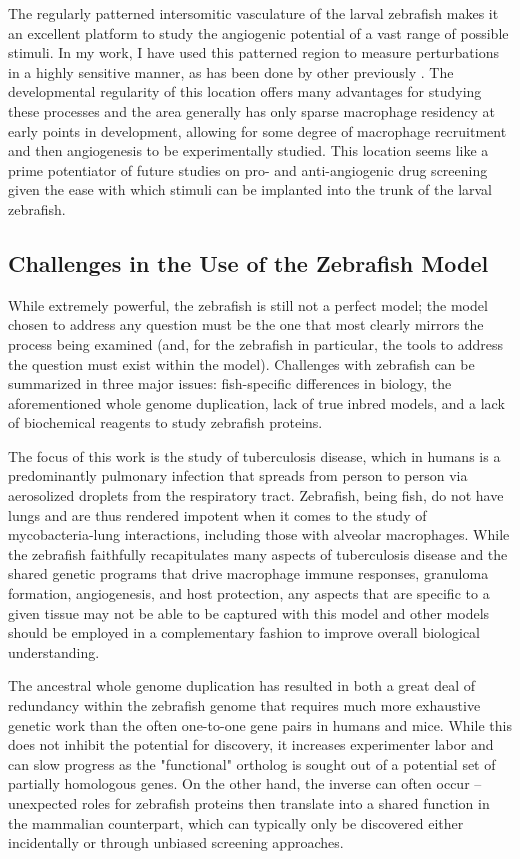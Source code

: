 The regularly patterned intersomitic vasculature of the larval zebrafish makes it an excellent platform to study the angiogenic potential of a vast range of possible stimuli. In my work, I have used this patterned region to measure perturbations in a highly sensitive manner, as has been done by other previously \citep{Oehlers2015, Walton2018}. The developmental regularity of this location offers many advantages for studying these processes and the area generally has only sparse macrophage residency at early points in development, allowing for some degree of macrophage recruitment and then angiogenesis to be experimentally studied. This location seems like a prime potentiator of future studies on pro- and anti-angiogenic drug screening given the ease with which stimuli can be implanted into the trunk of the larval zebrafish.

\subsection{Challenges in the Use of the Zebrafish Model}\label{zfchal}

While extremely powerful, the zebrafish is still not a perfect model; the model chosen to address any question must be the one that most clearly mirrors the process being examined (and, for the zebrafish in particular, the tools to address the question must exist within the model). Challenges with zebrafish can be summarized in three major issues: fish-specific differences in biology, the aforementioned whole genome duplication, lack of true inbred models, and a lack of biochemical reagents to study zebrafish proteins.

The focus of this work is the study of tuberculosis disease, which in humans is a predominantly pulmonary infection that spreads from person to person via aerosolized droplets from the respiratory tract. Zebrafish, being fish, do not have lungs and are thus rendered impotent when it comes to the study of mycobacteria-lung interactions, including those with alveolar macrophages. While the zebrafish faithfully recapitulates many aspects of tuberculosis disease and the shared genetic programs that drive macrophage immune responses, granuloma formation, angiogenesis, and host protection, any aspects that are specific to a given tissue may not be able to be captured with this model and other models should be employed in a complementary fashion to improve overall biological understanding. 

The ancestral whole genome duplication has resulted in both a great deal of redundancy within the zebrafish genome that requires much more exhaustive genetic work than the often one-to-one gene pairs in humans and mice. While this does not inhibit the potential for discovery, it increases experimenter labor and can slow progress as the "functional" ortholog is sought out of a potential set of partially homologous genes. On the other hand, the inverse can often occur -- unexpected roles for zebrafish proteins then translate into a shared function in the mammalian counterpart, which can typically only be discovered either incidentally or through unbiased screening approaches.

